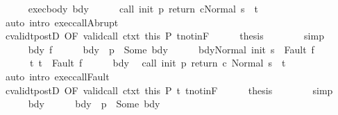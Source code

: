 \begin{isabellebody}
\isanewline
\ \ \ \ \isamarkupfalse%
\ exec{\isacharunderscore}body\ bdy\isanewline
\ \ \ \ \isamarkupfalse%
\ {\isachardoublequoteopen}{\isasymGamma}{\isasymturnstile}{\isasymlangle}call\ init\ p\ return{\isacharprime}\ c{\isacharcomma}Normal\ s{\isasymrangle}\ {\isasymRightarrow}\ t{\isachardoublequoteclose}\ \isanewline
\ \ \ \ \ \ \isamarkupfalse%
\ {\isacharparenleft}auto\ intro{\isacharcolon}\ exec{\isacharunderscore}callAbrupt{\isacharparenright}\isanewline
\ \ \ \ \isamarkupfalse%
\ cvalidt{\isacharunderscore}postD\ {\isacharbrackleft}OF\ valid{\isacharunderscore}call\ ctxt\ this{\isacharbrackright}\ P\ t{\isacharunderscore}notin{\isacharunderscore}F\isanewline
\ \ \ \ \isamarkupfalse%
\ {\isacharquery}thesis\isanewline
\ \ \ \ \ \ \isamarkupfalse%
\ simp\isanewline
\ \ \isamarkupfalse%
\isanewline
\ \ \ \ \isamarkupfalse%
\ bdy\ f\isanewline
\ \ \ \ \isamarkupfalse%
\ bdy{\isacharcolon}\ {\isachardoublequoteopen}{\isasymGamma}\ p\ {\isacharequal}\ Some\ bdy{\isachardoublequoteclose}\isanewline
\ \ \ \ \isamarkupfalse%
\ {\isachardoublequoteopen}{\isasymGamma}{\isasymturnstile}{\isasymlangle}bdy{\isacharcomma}Normal\ {\isacharparenleft}init\ s{\isacharparenright}{\isasymrangle}\ {\isasymRightarrow}\ Fault\ f{\isachardoublequoteclose}\ \ \isanewline
\ \ \ \ \ \ t{\isacharcolon}\ {\isachardoublequoteopen}t\ {\isacharequal}\ Fault\ f{\isachardoublequoteclose}\isanewline
\ \ \ \ \isamarkupfalse%
\ bdy\ \isamarkupfalse%
\ {\isachardoublequoteopen}{\isasymGamma}{\isasymturnstile}{\isasymlangle}call\ init\ p\ return{\isacharprime}\ c\ {\isacharcomma}Normal\ s{\isasymrangle}\ {\isasymRightarrow}\ t{\isachardoublequoteclose}\isanewline
\ \ \ \ \ \ \isamarkupfalse%
\ {\isacharparenleft}auto\ intro{\isacharcolon}\ exec{\isacharunderscore}callFault{\isacharparenright}\isanewline
\ \ \ \ \isamarkupfalse%
\ cvalidt{\isacharunderscore}postD\ {\isacharbrackleft}OF\ valid{\isacharunderscore}call\ ctxt\ this\ P{\isacharbrackright}\ t\ t{\isacharunderscore}notin{\isacharunderscore}F\isanewline
\ \ \ \ \isamarkupfalse%
\ {\isacharquery}thesis\isanewline
\ \ \ \ \ \ \isamarkupfalse%
\ simp\isanewline
\ \ \isamarkupfalse%
\isanewline
\ \ \ \ \isamarkupfalse%
\ bdy\isanewline
\ \ \ \ \isamarkupfalse%
\ bdy{\isacharcolon}\ {\isachardoublequoteopen}{\isasymGamma}\ p\ {\isacharequal}\ Some\ bdy{\isachardoublequoteclose}\isanewline

\end{isabellebody}
